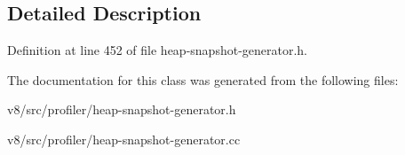 \subsection{Detailed Description}


Definition at line 452 of file heap-\/snapshot-\/generator.\+h.



The documentation for this class was generated from the following files\+:\begin{DoxyCompactItemize}
\item 
v8/src/profiler/heap-\/snapshot-\/generator.\+h\item 
v8/src/profiler/heap-\/snapshot-\/generator.\+cc\end{DoxyCompactItemize}
